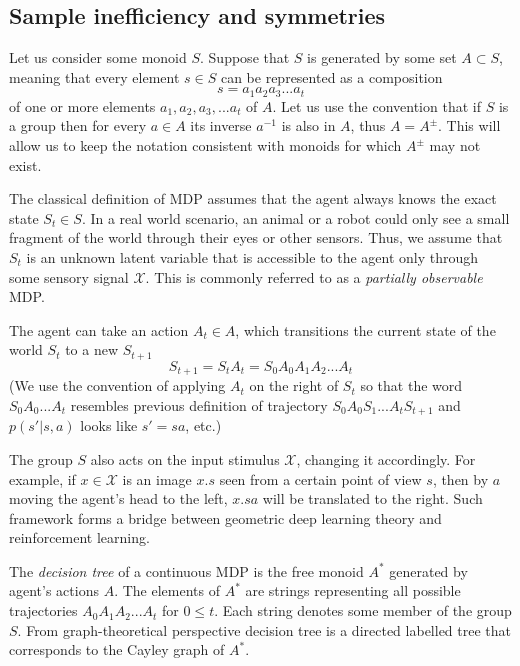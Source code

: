 \documentclass[12pt]{article}
\begin{document}
\subsection{Sample inefficiency and symmetries}

Let us consider some monoid $S$. Suppose that $S$ is generated by some set $A \subset S$, meaning that every element $s\in S$ can be represented as a composition 
\[
s = a_1 a_2 a_3 ... a_t
\]
of one or more elements $a_1,a_2,a_3,...a_t$ of $A$. Let us use the convention that if $S$ is a group then for every $a\in A$ its inverse $a^{-1}$ is also in $A$, thus $A=A^{\pm}$. This will allow us to keep the notation consistent with monoids for which $A^{\pm}$ may not exist.  

The classical definition of MDP assumes that the agent always knows the exact state $S_t \in S$. In a real world scenario, an animal or a robot could only see a small fragment of the world through their eyes or other sensors. Thus, we assume that $S_t$ is an unknown latent variable that is accessible to the agent only through some sensory signal $\mathcal{X}$. This is commonly referred to as a \textit{partially observable} MDP. 

The agent can take an action $A_t\in A$, which transitions the current state of the world $S_t$ to a new $S_{t+1}$
\[
S_{t+1} = S_{t}A_t = S_0 A_0 A_1 A_2 ... A_t
\]
(We use the convention of applying $A_t$ on the right of $S_t$ so that the word $S_0 A_0...A_t$ resembles previous definition of trajectory $S_0 A_0S_1...A_tS_{t+1}$ and $p(s'|s,a)$ looks like $s'=sa$, etc.)

The group $S$ also acts on the input stimulus $\mathcal{X}$, changing it accordingly. For example, if $x\in\mathcal{X}$ is an image $x.s$ seen from a certain point of view $s$, then by $a$ moving the agent's head to the left, $x.sa$ will be translated to the right.  Such framework forms a bridge between geometric deep learning theory and reinforcement learning.

The \textit{decision tree} of a continuous MDP is the free monoid $A^*$ generated by agent's actions $A$. The elements of $A^*$ are strings representing all possible trajectories $ A_0 A_1 A_2 ... A_t$ for $0\le t$.  Each string denotes some member of the group $S$. From graph-theoretical perspective decision tree is a directed labelled tree that corresponds to the Cayley graph of $A^*$. 
\end{document}
